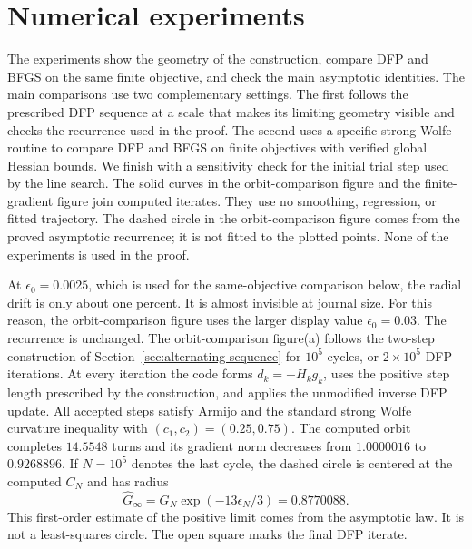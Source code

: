 \documentclass[11pt]{article}
\begin{document}
\section{Numerical experiments}
\label{sec:numerics}

The experiments show the geometry of the construction, compare DFP and BFGS
on the same finite objective, and check the main asymptotic identities.  The
main comparisons use two complementary settings.  The first follows the
prescribed DFP sequence at a scale that makes its limiting geometry visible
and checks the recurrence used in the proof.  The second uses a specific
strong Wolfe routine to compare DFP and BFGS on finite objectives with
verified global Hessian bounds.  We finish with a sensitivity check for the
initial trial step used by the line search.  The solid curves in
the orbit-comparison figure and
the finite-gradient figure join computed iterates.  They use no
smoothing, regression, or fitted trajectory.  The dashed circle in
the orbit-comparison figure comes from the proved asymptotic recurrence;
it is not fitted to the plotted points.  None of the experiments is used in
the proof.


At $\epsilon_0=0.0025$, which is used for the same-objective comparison below,
the radial drift is only about one percent.  It is almost invisible at journal
size.  For this reason, the orbit-comparison figure uses the larger
display value $\epsilon_0=0.03$.  The recurrence is unchanged.
The orbit-comparison figure(a) follows the two-step construction of
Section~\ref{sec:alternating-sequence} for $10^5$ cycles, or $2\times10^5$
DFP iterations.  At every iteration the code forms $d_k=-H_kg_k$, uses the
positive step length prescribed by the construction, and applies the
unmodified inverse DFP update.  All accepted steps satisfy Armijo and the
standard strong Wolfe curvature inequality with
$(c_1,c_2)=(0.25,0.75)$.  The computed orbit completes $14.5548$ turns and its
gradient norm decreases from $1.0000016$ to $0.9268896$.  If $N=10^5$ denotes
the last cycle, the dashed circle is centered at the computed $C_N$ and has
radius
\[
  \widehat G_\infty=G_N\exp(-13\epsilon_N/3)=0.8770088.
\]
This first-order estimate of the positive limit comes from the asymptotic law.
It is not a least-squares circle.  The open square marks the final DFP iterate.
\end{document}
